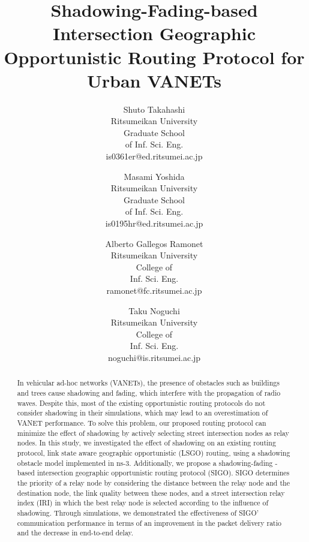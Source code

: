 \documentclass[conference]{IEEEtran}
\begin{document}
\title{Shadowing-Fading-based Intersection Geographic Opportunistic Routing Protocol for Urban VANETs
}

\author{
    Shuto Takahashi\\
    Ritsumeikan University\\
    Graduate School\\
    of Inf. Sci. Eng.\\
    is0361er@ed.ritsumei.ac.jp
  \and
    Masami Yoshida\\
    Ritsumeikan University\\
    Graduate School\\
    of Inf. Sci. Eng.\\
    is0195hr@ed.ritsumei.ac.jp
    \and
    Alberto Gallegos Ramonet\\
    Ritsumeikan University\\
    College of\\
    Inf. Sci. Eng.\\
    ramonet@fc.ritsumei.ac.jp
    \and
    Taku Noguchi\\
    Ritsumeikan University\\
    College of\\
    Inf. Sci. Eng.\\
    noguchi@is.ritsumei.ac.jp
}


\maketitle

\begin{abstract}

In vehicular ad-hoc networks (VANETs), the presence of obstacles such as buildings and trees cause shadowing and fading, which interfere with the propagation of radio waves. Despite this, most of the existing opportunistic routing protocols do not consider shadowing in  their simulations, which may lead to an overestimation of VANET performance. 
To solve this problem, our proposed routing protocol can minimize the effect of shadowing by actively selecting street intersection nodes as relay nodes. In this study, we investigated the effect of shadowing on an existing routing protocol, link state aware geographic opportunistic (LSGO) routing, using a shadowing obstacle model implemented in ns-3.
Additionally, we propose a shadowing-fading -based intersection geographic opportunistic routing protocol (SIGO). 
SIGO determines the priority of a relay node by considering the distance between the relay node and the destination node, the link quality between these nodes, and a street intersection relay index (IRI) in which the best relay node is selected according to the influence of shadowing.
Through simulations, we demonstrated the effectiveness of SIGO' communication performance in terms of an improvement in the packet delivery ratio and the decrease in end-to-end delay.
\end{abstract}
\end{document}
